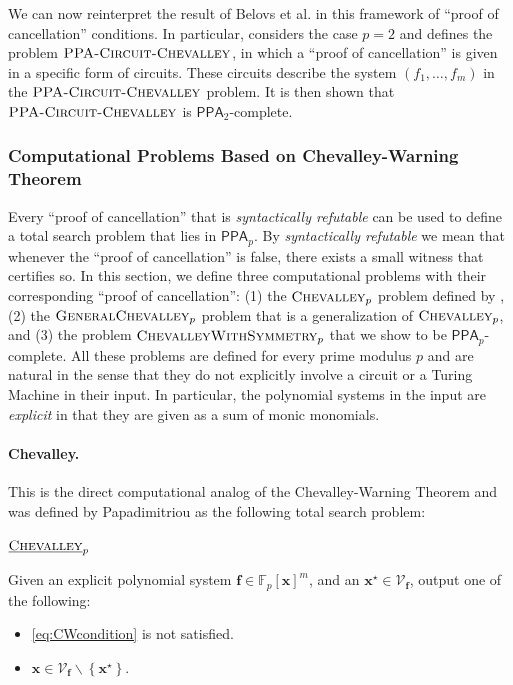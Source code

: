 \documentclass[10pt,a4paper]{article}
\theoremstyle{definition}
\theoremstyle{remark}
\def\set#1{\left\{#1\right\}}
\newcommand{\bbF}{\ensuremath{\mathbb{F}}}
\newcommand{\calV}{\mathcal{V}}
\newcommand{\vecf}{\ensuremath{\boldsymbol{f}}}
\newcommand{\vecx}{\ensuremath{\boldsymbol{x}}}
\newcommand{\class}[1]{\ensuremath{\mathsf{#1}}\xspace}
\newcommand{\PPA}{\class{PPA}}
\newcommand{\pnum}{p}
\newcommand{\lChevalleyp}{\textsc{GeneralChevalley}_{\pnum}}
\newcommand{\cChevalleyp}{\textsc{ChevalleyWithSymmetry}_{\pnum}}
\newcommand{\eChevalleyp}{\textsc{Chevalley}_{\pnum}}
\newcommand{\eChevalley}{\textsc{Chevalley}}
\begin{document}
We can now reinterpret the result of Belovs et
al. \cite{r8} in this framework of ``proof of cancellation'' conditions. In particular, \cite{r8} considers the
case $p = 2$ and defines the problem $\textsc{PPA-Circuit-Chevalley}$, in which a ``proof of
cancellation'' is given in a specific form of circuits. These circuits describe the
system $(f_1, \ldots, f_m)$ in the $\textsc{PPA-Circuit-Chevalley}$ problem. It is then shown that $\textsc{PPA-Circuit-Chevalley}$ is $\PPA_2$-complete.


\subsubsection{Computational Problems Based on Chevalley-Warning Theorem}
\label{sec:computationalChevalleyWarning}

  Every ``proof of cancellation'' that is \textit{syntactically refutable} can be used to define
  a total search problem that lies in $\PPA_p$. By {\em syntactically refutable} we mean that whenever the
  ``proof of cancellation'' is false, there exists a small witness that certifies so. In this
  section, we define three computational problems with their corresponding ``proof of
  cancellation'': (1) the $\eChevalleyp$ problem defined by \cite{r33}, (2) the
  $\lChevalleyp$ problem that is a generalization of $\eChevalleyp$, and (3) the problem
  $\cChevalleyp$ that we show to be $\PPA_p$-complete. All these problems are
  defined for every prime modulus $p$ and are natural in the sense that they do not explicitly
  involve a circuit or a Turing Machine in their input. In particular, the polynomial systems in the input are {\em explicit} in that they are given as a sum of monic monomials. \bigskip

\paragraph{Chevalley.}
  This is the direct computational analog of the Chevalley-Warning Theorem and was
defined by Papadimitriou \cite{r33} as the following total
search problem:
\medskip

\noindent $\underbar{\eChevalley}_{\pnum}$

\noindent Given an explicit polynomial system $\vecf \in \bbF_p[\vecx]^m$, and an
$\vecx^{\star} \in \calV_{\vecf}$, output one of the following:\vspace*{-0.8mm}
\begin{itemize}
	\item[$\triangleright$] [{\em Refuting witness}] \eqref{eq:CWcondition} is not satisfied.
	\item[$\triangleright$] $\vecx \in \calV_{\vecf} \smallsetminus \set{\vecx^{\star}}$.
\end{itemize}
\end{document}
